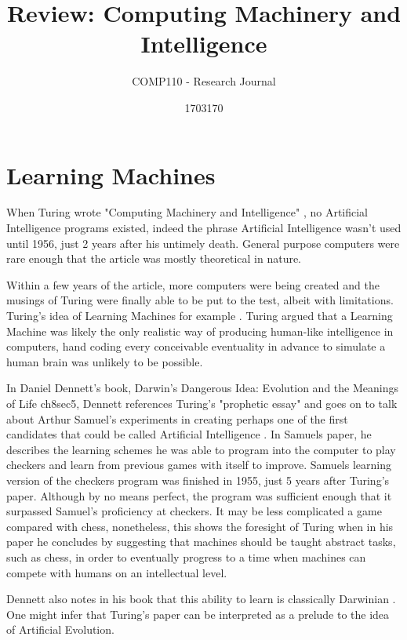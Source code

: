 \documentclass{scrartcl}
\title{Review: Computing Machinery and Intelligence
}
\subtitle{COMP110 - Research Journal}
\author{1703170}
\begin{document}
\maketitle



\section{Learning Machines}


When Turing wrote "Computing Machinery and Intelligence" \cite{turing1950computing:1}, no Artificial Intelligence programs existed, indeed the phrase Artificial Intelligence wasn't used until 1956, just 2 years after his untimely death. General purpose computers were rare enough that the article was mostly theoretical in nature. \par
Within a few years of the article, more computers were being created and the musings of Turing were finally able to be put to the test, albeit with limitations. Turing's idea of Learning Machines for example \cite{ramscar2010computing:2}. Turing argued that a Learning Machine was likely the only realistic way of producing human-like intelligence in computers, hand coding every conceivable eventuality in advance to simulate a human brain was unlikely to be possible. \par
In Daniel Dennett's book, Darwin's Dangerous Idea: Evolution and the Meanings of Life \cite{dennett1996darwin:3}ch8sec5, Dennett references Turing's "prophetic essay" and goes on to talk about Arthur Samuel's experiments in creating perhaps one of the first candidates that could be called Artificial Intelligence \cite{samuel2000some:4}. In Samuels paper, he describes the learning schemes he was able to program into the computer to play checkers and learn from previous games with itself to improve. Samuels learning version of the checkers program was finished in 1955, just 5 years after Turing's paper. Although by no means perfect, the program was sufficient enough that it surpassed Samuel's proficiency at checkers. It may be less complicated a game compared with chess, nonetheless, this shows the foresight of Turing when in his paper he concludes by suggesting that machines should be taught abstract tasks, such as chess, in order to eventually progress to a time when machines can compete with humans on an intellectual level. \par
Dennett also notes in his book that this ability to learn is classically Darwinian \cite{darwin2009origin:5}. One might infer that Turing's paper can be interpreted as a prelude to the idea of Artificial Evolution.
\end{document}
